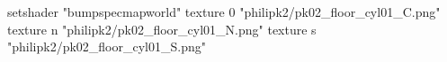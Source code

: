 setshader "bumpspecmapworld"
    texture 0 "philipk2/pk02_floor_cyl01_C.png"
    texture n "philipk2/pk02_floor_cyl01_N.png"
    texture s "philipk2/pk02_floor_cyl01_S.png"